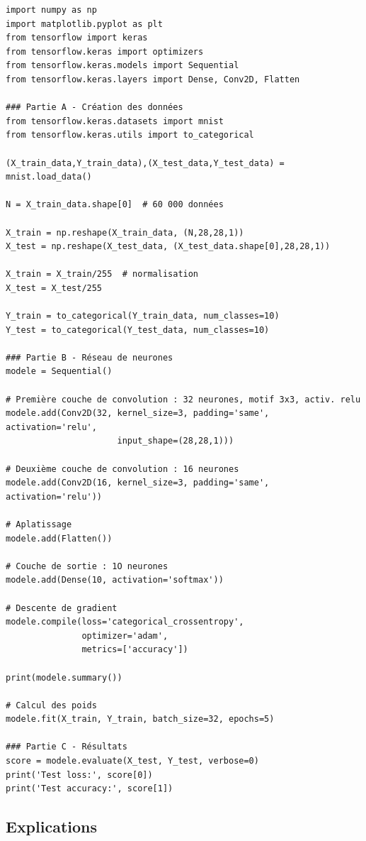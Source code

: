 \documentclass[11pt,class=report,crop=false]{standalone}
\begin{document}
\begin{lstlisting}
import numpy as np
import matplotlib.pyplot as plt
from tensorflow import keras
from tensorflow.keras import optimizers
from tensorflow.keras.models import Sequential
from tensorflow.keras.layers import Dense, Conv2D, Flatten

### Partie A - Création des données
from tensorflow.keras.datasets import mnist
from tensorflow.keras.utils import to_categorical

(X_train_data,Y_train_data),(X_test_data,Y_test_data) = mnist.load_data()

N = X_train_data.shape[0]  # 60 000 données

X_train = np.reshape(X_train_data, (N,28,28,1))
X_test = np.reshape(X_test_data, (X_test_data.shape[0],28,28,1))

X_train = X_train/255  # normalisation
X_test = X_test/255

Y_train = to_categorical(Y_train_data, num_classes=10)
Y_test = to_categorical(Y_test_data, num_classes=10)

### Partie B - Réseau de neurones
modele = Sequential()

# Première couche de convolution : 32 neurones, motif 3x3, activ. relu
modele.add(Conv2D(32, kernel_size=3, padding='same', activation='relu',
                      input_shape=(28,28,1)))

# Deuxième couche de convolution : 16 neurones
modele.add(Conv2D(16, kernel_size=3, padding='same', activation='relu'))

# Aplatissage 
modele.add(Flatten())

# Couche de sortie : 1O neurones
modele.add(Dense(10, activation='softmax'))

# Descente de gradient
modele.compile(loss='categorical_crossentropy',
               optimizer='adam',
               metrics=['accuracy'])

print(modele.summary())

# Calcul des poids
modele.fit(X_train, Y_train, batch_size=32, epochs=5)

### Partie C - Résultats
score = modele.evaluate(X_test, Y_test, verbose=0)
print('Test loss:', score[0])
print('Test accuracy:', score[1])
\end{lstlisting}


\subsection{Explications}
\end{document}
